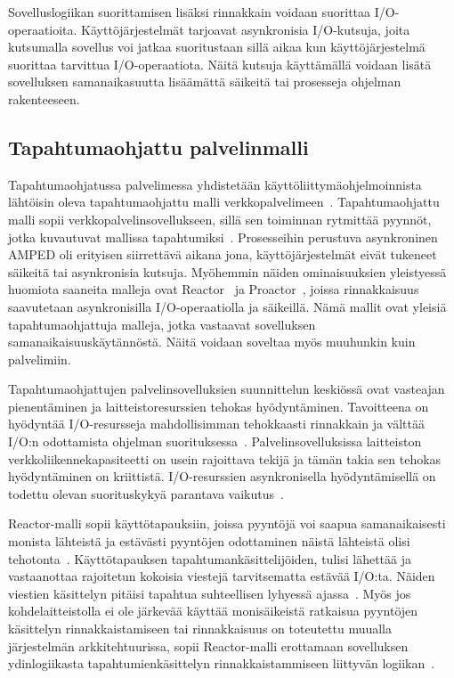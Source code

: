 \documentclass[12pt]{article}
\begin{document}
Sovelluslogiikan suorittamisen lisäksi rinnakkain voidaan suorittaa I/O-operaatioita.
Käyttöjärjestelmät tarjoavat asynkronisia I/O-kutsuja, joita kutsumalla
sovellus voi jatkaa suoritustaan sillä aikaa kun käyttöjärjestelmä
suorittaa tarvittua I/O-operaatiota. Näitä kutsuja käyttämällä voidaan
lisätä sovelluksen samanaikasuutta lisäämättä säikeitä
tai prosesseja ohjelman rakenteeseen.

\subsection{Tapahtumaohjattu palvelinmalli}

Tapahtumaohjatussa palvelimessa yhdistetään
käyttöliittymäohjelmoinnista lähtöisin oleva tapahtumaohjattu malli
verkkopalvelimeen~\cite{pai_flash:_1999}. Tapahtumaohjattu malli sopii verkkopalvelinsovellukseen,
sillä sen toiminnan rytmittää pyynnöt, jotka
kuvautuvat mallissa tapahtumiksi~\cite{schmidt_reactor:_1995}.
Prosesseihin perustuva asynkroninen AMPED\cite{pai_flash:_1999}
oli erityisen siirrettävä aikana jona, käyttöjärjestelmät
eivät tukeneet säikeitä tai asynkronisia kutsuja.
Myöhemmin näiden ominaisuuksien yleistyessä 
huomiota saaneita malleja ovat Reactor~\cite{schmidt_reactor:_1995}
ja Proactor~\cite{pyarali_proactor_1997}, joissa
rinnakkaisuus saavutetaan asynkronisilla I/O-operaatiolla
ja säikeillä. Nämä mallit ovat yleisiä tapahtumaohjattuja malleja, jotka
vastaavat sovelluksen samanaikaisuuskäytännöstä.
Näitä voidaan soveltaa myös muuhunkin kuin palvelimiin.


Tapahtumaohjattujen palvelinsovelluksien suunnittelun keskiössä
ovat vasteajan pienentäminen ja laitteistoresurssien tehokas hyödyntäminen.
Tavoitteena on hyödyntää I/O-resursseja mahdollisimman tehokkaasti
rinnakkain ja välttää I/O:n odottamista ohjelman suorituksessa~\cite{pai_flash:_1999}.
Palvelinsovelluksissa
laitteiston verkkoliikennekapasiteetti on usein rajoittava tekijä ja tämän takia
sen tehokas hyödyntäminen on kriittistä. I/O-resurssien asynkronisella hyödyntämisellä on todettu
olevan suorituskykyä parantava vaikutus~\cite{hu_applying_1998}.

Reactor-malli sopii käyttötapauksiin, joissa pyyntöjä voi saapua 
samanaikaisesti monista lähteistä ja estävästi
pyyntöjen odottaminen näistä lähteistä olisi tehotonta~\cite{schmidt_reactor:_1995}.
Käyttötapauksen tapahtumankäsittelijöiden, tulisi
lähettää ja vastaanottaa rajoitetun kokoisia viestejä
tarvitsematta estävää I/O:ta. Näiden viestien käsittelyn
pitäisi tapahtua suhteellisen lyhyessä ajassa~\cite{schmidt_reactor:_1995}.
Myös jos kohdelaitteistolla ei ole järkevää käyttää monisäikeistä
ratkaisua pyyntöjen käsittelyn rinnakkaistamiseen tai rinnakkaisuus
on toteutettu muualla järjestelmän arkkitehtuurissa, sopii Reactor-malli
erottamaan sovelluksen ydinlogiikasta tapahtumienkäsittelyn
rinnakkaistammiseen liittyvän logiikan~\cite{schmidt_reactor:_1995}.
\end{document}
